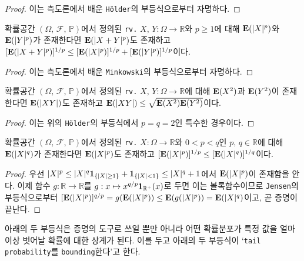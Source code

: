 \begin{proof}
    이는 측도론에서 배운 \texttt{H\"older}의 부등식으로부터 자명하다.
\end{proof}

\begin{theorem}
    확률공간 $(\Omega,\,\mathcal{F},\,\mathbb{P})$에서 정의된 \texttt{rv.} $X,\,Y:\Omega\to\mathbb{R}$와 $p\geq1$에 대해 $\mathbf{E}(|X|^p)$와 $\mathbf{E}(|Y|^p)$가 존재한다면 $\mathbf{E}(|X+Y|^p)$도 존재하고 $[\mathbf{E}(|X+Y|^p)]^{1/p}\leq[\mathbf{E}(|X|^p)]^{1/p}+[\mathbf{E}(|Y|^p)]^{1/p}$이다.
\end{theorem}

\begin{proof}
    이는 측도론에서 배운 \texttt{Minkowski}의 부등식으로부터 자명하다.
\end{proof}

\begin{corollary}
    확률공간 $(\Omega,\,\mathcal{F},\,\mathbb{P})$에서 정의된 \texttt{rv.} $X,\,Y:\Omega\to\mathbb{R}$에 대해 $\mathbf{E}(X^2)$과 $\mathbf{E}(Y^2)$이 존재한다면 $\mathbf{E}(|XY|)$도 존재하고 $\mathbf{E}(|XY|)\leq\sqrt{\mathbf{E}(X^2)\mathbf{E}(Y^2)}$이다.
\end{corollary}

\begin{proof}
    이는 위의 \texttt{H\"older}의 부등식에서 $p=q=2$인 특수한 경우이다.
\end{proof}

\begin{theorem}
    확률공간 $(\Omega,\,\mathcal{F},\,\mathbb{P})$에서 정의된 \texttt{rv.} $X:\Omega\to\mathbb{R}$와 $0<p<q$인 $p,\,q\in\mathbb{R}$에 대해 $\mathbf{E}(|X|^q)$가 존재한다면 $\mathbf{E}(|X|^p)$도 존재하고 $[\mathbf{E}(|X|^p)]^{1/p}\leq[\mathbf{E}(|X|^q)]^{1/q}$이다.
\end{theorem}

\begin{proof}
    우선 $|X|^p\leq|X|^q\mathbf{1}_{\{|X|\geq1\}}+\mathbf{1}_{\{|X|<1\}}\leq|X|^q+1$에서 $\mathbf{E}(|X|^p)$이 존재함을 안다. 이제 함수 $g:\mathbb{R}\to\mathbb{R}$를 $g:x\mapsto x^{q/p}\mathbf{1}_{\mathbb{R}^+}(x)$로 두면 이는 볼록함수이므로 \texttt{Jensen}의 부등식으로부터 $[\mathbf{E}(|X|^p)]^{q/p}=g(\mathbf{E}(|X|^p))\leq\mathbf{E}(g(|X|^p))=\mathbf{E}(|X|^q)$이고, 곧 증명이 끝난다.
\end{proof}

아래의 두 부등식은 증명의 도구로 쓰일 뿐만 아니라 어떤 확률분포가 특정 값을 얼마 이상 벗어날 확률에 대한 상계가 된다. 이를 두고 아래의 두 부등식이 `\texttt{tail probability}를 \texttt{bounding}한다'고 한다.

